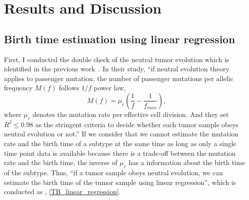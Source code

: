 \documentclass{article}
\begin{document}
\section{Results and Discussion}
\subsection{Birth time estimation using linear regression}

First, I conducted the double check of the neutral tumor evolution which is identified in the previous work~\cite{williams2016identification}.
In their study, ``if neutral evolution theory applies to passenger mutation, the number of passenger mutations per allelic frequency $M(f)$ follows $1/f$ power law,
\begin{equation}
 M(f) = \mu_e \left( \frac{1}{f} - \frac{1}{f_{max}}\right),\label{neutral_evolution}
\end{equation}
where $\mu_e$ denotes the mutation rate per effective cell division.
And they set $R^2 \leq 0.98$ as the stringent criteria to decide whether each tumor sample obeys neutral evolution or not.''
If we consider that we cannot estimate the mutation rate and the birth time of a subtype at the same time as long as only a single time point data is available
because there is a trade-off between the mutation rate and the birth time, the inverse of $\mu_e$ has a information about the birth time of the subtype.
Thus, ``if a tumor sample obeys neutral evolution, we can estimate the birth time of the tumor sample using linear regression'', which is conducted as , \ref{TB_linear_regression}.
\end{document}
